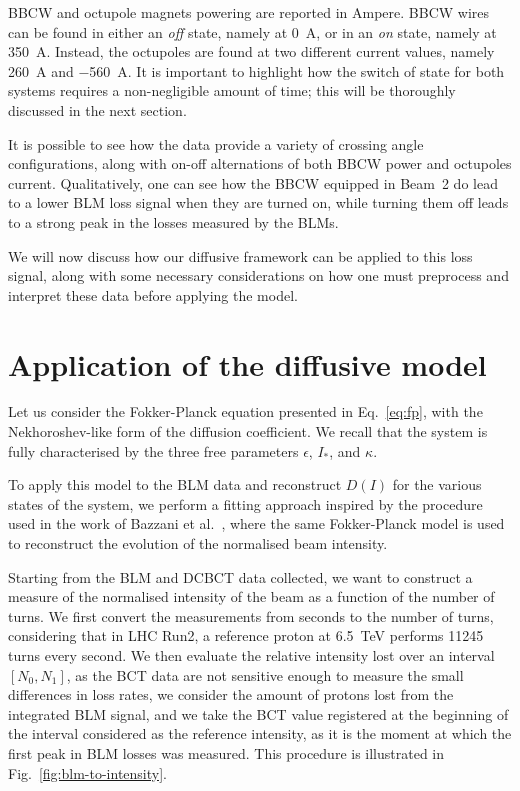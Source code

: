 BBCW and octupole magnets powering are reported in Ampere. BBCW wires can be found in either an \textit{off} state, namely at \SI{0}{\ampere}, or in an \textit{on} state, namely at \SI{350}{\ampere}. Instead, the octupoles are found at two different current values, namely \SI{260}{\ampere} and \SI{-560}{\ampere}. It is important to highlight how the switch of state for both systems requires a non-negligible amount of time; this will be thoroughly discussed in the next section.

It is possible to see how the data provide a variety of crossing angle configurations, along with on-off alternations of both BBCW power and octupoles current. Qualitatively, one can see how the BBCW equipped in Beam~2 do lead to a lower BLM loss signal when they are turned on, while turning them off leads to a strong peak in the losses measured by the BLMs.

We will now discuss how our diffusive framework can be applied to this loss signal, along with some necessary considerations on how one must preprocess and interpret these data before applying the model. 

\section{Application of the diffusive model}\label{sec:5:wire-model}

Let us consider the Fokker-Planck equation presented in Eq.~\eqref{eq:fp}, with the Nekhoroshev-like form of the diffusion coefficient. We recall that the system is fully characterised by the three free parameters $\epsilon$, $I_\ast$, and $\kappa$.

To apply this model to the BLM data and reconstruct $D(I)$ for the various states of the system, we perform a fitting approach inspired by the procedure used in the work of Bazzani et al.~\cite{bazzani2020diffusion}, where the same Fokker-Planck model is used to reconstruct the evolution of the normalised beam intensity.

Starting from the BLM and DCBCT data collected, we want to construct a measure of the normalised intensity of the beam as a function of the number of turns. We first convert the measurements from seconds to the number of turns, considering that in LHC Run2, a reference proton at \SI{6.5}{TeV} performs 11245 turns every second. We then evaluate the relative intensity lost over an interval $[N_0, N_1]$, as the BCT data are not sensitive enough to measure the small differences in loss rates, we consider the amount of protons lost from the integrated BLM signal, and we take the BCT value registered at the beginning of the interval considered as the reference intensity, as it is the moment at which the first peak in BLM losses was measured. This procedure is illustrated in Fig.~\ref{fig:blm-to-intensity}.

